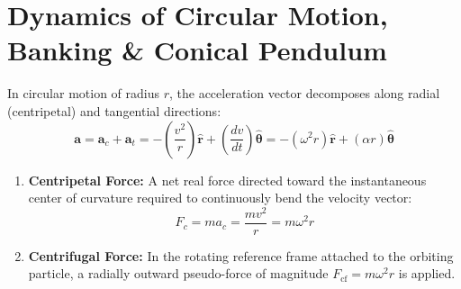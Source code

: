 \documentclass[10pt,a4paper]{article}
\begin{document}
\section{Dynamics of Circular Motion, Banking \& Conical Pendulum}

\begin{conceptbox}
In circular motion of radius $r$, the acceleration vector decomposes along radial (centripetal) and tangential directions:
\begin{equation}
  \mathbf{a} = \mathbf{a}_c + \mathbf{a}_t = -\left(\frac{v^2}{r}\right)\hat{\mathbf{r}} + \left(\frac{dv}{dt}\right)\hat{\boldsymbol{\theta}} = -(\omega^2 r)\hat{\mathbf{r}} + (\alpha r)\hat{\boldsymbol{\theta}}
\end{equation}
\begin{enumerate}[leftmargin=*]
  \item \textbf{Centripetal Force:} A net real force directed toward the instantaneous center of curvature required to continuously bend the velocity vector:
  \begin{equation}
    F_c = m a_c = \frac{m v^2}{r} = m \omega^2 r
  \end{equation}
  \item \textbf{Centrifugal Force:} In the rotating reference frame attached to the orbiting particle, a radially outward pseudo-force of magnitude $F_{\text{cf}} = m\omega^2 r$ is applied.
\end{enumerate}
\end{conceptbox}
\end{document}
